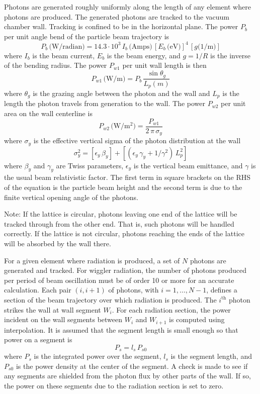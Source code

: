 \documentclass[11pt]{article}
\begin{document}
Photons are generated roughly uniformly along the length of any
element where photons are produced. The generated photons are tracked
to the vacuum chamber wall. Tracking is confined to be in the
horizontal plane.  The power $P_b$ per unit angle bend of the particle
beam trajectory is\cite{b:sands}
\begin{equation}
  P_b \, \mbox{(W/radian)} = 14.3 \cdot 10^3  \, I_b \, \mbox{(Amps)} \, 
  [E_b \, \mbox{(eV)}]^4 \, [g \mbox{(1/m)}] 
\end{equation}
where $I_b$ is the beam current, $E_b$ is the beam energy, and $g =
1/R$ is the inverse of the bending radius. The power $P_{w1}$ per unit
wall length is then
\begin{equation}
  P_{w1} \, \mbox{(W/m)} = P_b \, \frac{\sin\theta_g}{L_p (m)}
\end{equation}
where $\theta_g$ is the grazing angle between the photon and the wall
and $L_p$ is the length the photon travels from generation to the wall.
The power $P_{w2}$ per unit area on the wall centerline is
\begin{equation}
  P_{w2} \, \mbox{(W/m$^2$)} = \frac{P_{w1}}{2 \, \pi \, \sigma_y}
\end{equation}
where $\sigma_y$ is the effective vertical sigma of the photon distribution at the wall 
\begin{equation}
  \sigma_y^2 = [\epsilon_y \, \beta_y] + [(\epsilon_y \, \gamma_y + 1 / \gamma^2) \, L_p^2]
\end{equation}
where $\beta_y$ and $\gamma_y$ are Twiss parameters, $\epsilon_y$ is
the vertical beam emittance, and $\gamma$ is the usual beam
relativistic factor. The first term in square brackets on the RHS of
the equation is the particle beam height and the second term is due to
the finite vertical opening angle of the photons.

Note: If the lattice is circular, photons leaving one end of the
lattice will be tracked through from the other end. That is, such
photons will be handled correctly. If the lattice is not circular,
photons reaching the ends of the lattice will be absorbed by the wall
there.

For a given element where radiation is produced, a set of $N$ photons
are generated and tracked. For wiggler radiation, the number of
photons produced per period of beam oscillation must be of order 10 or
more for an accurate calculation.  Each pair $(i, i+1)$ of photons, with
$i = 1, \ldots, N-1$, defines a section of the beam trajectory over which
radiation is produced.
The $i^{\mbox{th}}$ photon strikes
the wall at wall segment $W_i$. 
For each radiation section, the power incident on the wall segments between $W_i$
and $W_{i+1}$ is computed using interpolation. It is assumed that the
segment length is small enough so that power on a segment is
\begin{equation}
  P_s = l_s \, P_{s0}
\end{equation}
where $P_s$ is the integrated power over the segment, $l_s$ is the
segment length, and $P_{s0}$ is the power density at the center of the
segment. A check is made to see if any segments are shielded from the
photon flux by other parts of the wall. If so, the power on these
segments due to the radiation section is set to zero.
\end{document}
